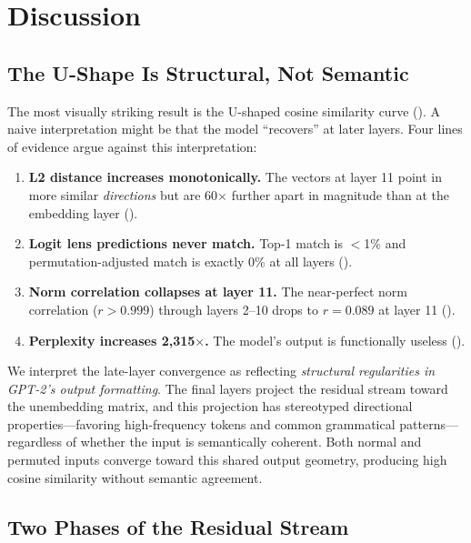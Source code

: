 \section{Discussion}
\label{sec:discussion}

\subsection{The U-Shape Is Structural, Not Semantic}

The most visually striking result is the U-shaped cosine similarity curve (). A naive interpretation might be that the model ``recovers'' at later layers. Four lines of evidence argue against this interpretation:

\begin{enumerate}[leftmargin=*,itemsep=2pt,topsep=2pt]
    \item \textbf{L2 distance increases monotonically.} The vectors at layer 11 point in more similar \emph{directions} but are 60$\times$ further apart in magnitude than at the embedding layer ().
    \item \textbf{Logit lens predictions never match.} Top-1 match is $<$1\% and permutation-adjusted match is exactly 0\% at all layers ().
    \item \textbf{Norm correlation collapses at layer 11.} The near-perfect norm correlation ($r > 0.999$) through layers 2--10 drops to $r = 0.089$ at layer 11 ().
    \item \textbf{Perplexity increases 2,315$\times$.} The model's output is functionally useless ().
\end{enumerate}

We interpret the late-layer convergence as reflecting \emph{structural regularities in GPT-2's output formatting}. The final layers project the residual stream toward the unembedding matrix, and this projection has stereotyped directional properties---favoring high-frequency tokens and common grammatical patterns---regardless of whether the input is semantically coherent. Both normal and permuted inputs converge toward this shared output geometry, producing high cosine similarity without semantic agreement.

\subsection{Two Phases of the Residual Stream}

